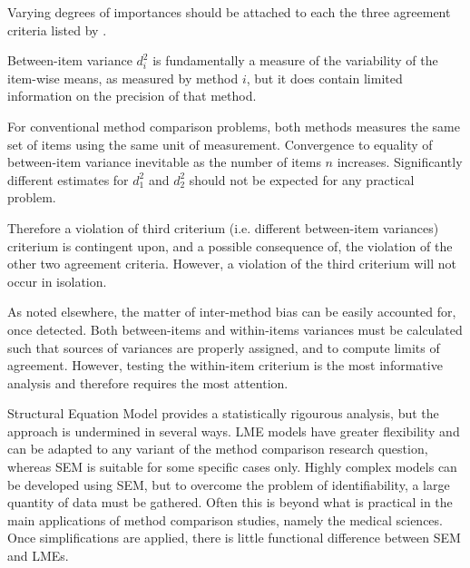 Varying degrees of importances should be attached to each the three agreement criteria listed by \citet{barnhart}.

Between-item variance $d^2_i$ is fundamentally a measure of the variability of the item-wise means, as measured by method $i$, but it does contain limited information on the precision of that method. 

For conventional method comparison problems, both methods measures the same set of items using the same unit of measurement. Convergence to equality of between-item variance inevitable as the number of items $n$ increases. Significantly different estimates for $d^2_1$ and $d^2_2$ should not be expected for any practical problem. 

Therefore a violation of third criterium (i.e. different between-item variances) criterium is contingent upon, and a  
possible consequence of, the violation of the other two agreement criteria. However, a violation of the third criterium will not occur in isolation. 

As noted elsewhere, the matter of inter-method bias can be easily accounted for, once detected. Both between-items and within-items variances must be calculated such that sources of variances are properly assigned, and to compute limits of agreement. However, testing the within-item criterium is the most informative analysis and therefore requires the most attention. 






Structural Equation Model provides a statistically rigourous analysis, but the approach is undermined in several ways.
LME models have greater flexibility and can be adapted to any variant of the method comparison research question, whereas 
SEM is suitable for some specific cases only. Highly complex models can be developed using SEM, but to overcome the problem of identifiability, a large quantity of data must be gathered.
Often this is beyond what is practical in the main applications of method comparison studies, namely the medical sciences. Once simplifications are applied, there is little functional difference between SEM and LMEs.


